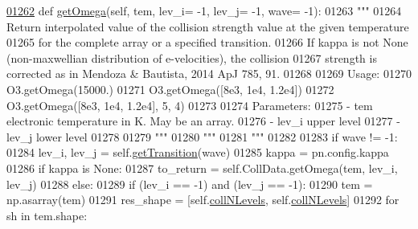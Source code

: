 \begin{DoxyCode}
\hypertarget{classpyneb_1_1core_1_1pynebcore_1_1_atom_l01262}{}\hyperlink{classpyneb_1_1core_1_1pynebcore_1_1_atom_ae133eed382e284df01f2183da341534b}{01262}     \textcolor{keyword}{def }\hyperlink{classpyneb_1_1core_1_1pynebcore_1_1_atom_ae133eed382e284df01f2183da341534b}{getOmega}(self, tem, lev\_i= -1, lev\_j= -1, wave= -1):
01263         \textcolor{stringliteral}{"""}
01264 \textcolor{stringliteral}{        Return interpolated value of the collision strength value at the given temperature }
01265 \textcolor{stringliteral}{            for the complete array or a specified transition.}
01266 \textcolor{stringliteral}{        If kappa is not None (non-maxwellian distribution of e-velocities), the collision }
01267 \textcolor{stringliteral}{            strength is corrected as in Mendoza & Bautista, 2014 ApJ 785, 91.}
01268 \textcolor{stringliteral}{}
01269 \textcolor{stringliteral}{        Usage:}
01270 \textcolor{stringliteral}{            O3.getOmega(15000.)}
01271 \textcolor{stringliteral}{            O3.getOmega([8e3, 1e4, 1.2e4])}
01272 \textcolor{stringliteral}{            O3.getOmega([8e3, 1e4, 1.2e4], 5, 4)}
01273 \textcolor{stringliteral}{        }
01274 \textcolor{stringliteral}{        Parameters:}
01275 \textcolor{stringliteral}{            - tem    electronic temperature in K. May be an array.}
01276 \textcolor{stringliteral}{            - lev\_i  upper level}
01277 \textcolor{stringliteral}{            - lev\_j  lower level}
01278 \textcolor{stringliteral}{}
01279 \textcolor{stringliteral}{        """}
01280         \textcolor{stringliteral}{"""}
01281 \textcolor{stringliteral}{        """}
01282         
01283         \textcolor{keywordflow}{if} wave != -1:
01284             lev\_i, lev\_j = self.\hyperlink{classpyneb_1_1core_1_1pynebcore_1_1_atom_a7c9f17a3d9e841267add92377d9d1ede}{getTransition}(wave)
01285         kappa = pn.config.kappa 
01286         \textcolor{keywordflow}{if} kappa \textcolor{keywordflow}{is} \textcolor{keywordtype}{None}:
01287             to\_return = self.CollData.getOmega(tem, lev\_i, lev\_j)
01288         \textcolor{keywordflow}{else}:
01289             \textcolor{keywordflow}{if} (lev\_i == -1) \textcolor{keywordflow}{and} (lev\_j == -1):
01290                 tem = np.asarray(tem)
01291                 res\_shape = [self.\hyperlink{classpyneb_1_1core_1_1pynebcore_1_1_atom_a8beaa0244d575054b3e2748a5e00d8db}{collNLevels}, self.\hyperlink{classpyneb_1_1core_1_1pynebcore_1_1_atom_a8beaa0244d575054b3e2748a5e00d8db}{collNLevels}]
01292                 \textcolor{keywordflow}{for} sh \textcolor{keywordflow}{in} tem.shape:

\end{DoxyCode}
